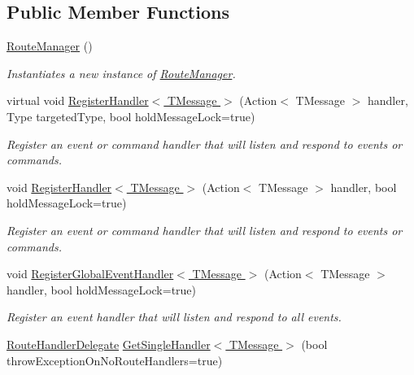 \subsection*{Public Member Functions}
\begin{DoxyCompactItemize}
\item 
\hyperlink{classCqrs_1_1Bus_1_1RouteManager_abcc8a62319ac7a6edd38ed2d26ef5234_abcc8a62319ac7a6edd38ed2d26ef5234}{Route\+Manager} ()
\begin{DoxyCompactList}\small\item\em Instantiates a new instance of \hyperlink{classCqrs_1_1Bus_1_1RouteManager}{Route\+Manager}. \end{DoxyCompactList}\item 
virtual void \hyperlink{classCqrs_1_1Bus_1_1RouteManager_a5a01e8a6c9ae6311bca2d9e5cb75a7b9_a5a01e8a6c9ae6311bca2d9e5cb75a7b9}{Register\+Handler$<$ T\+Message $>$} (Action$<$ T\+Message $>$ handler, Type targeted\+Type, bool hold\+Message\+Lock=true)
\begin{DoxyCompactList}\small\item\em Register an event or command handler that will listen and respond to events or commands. \end{DoxyCompactList}\item 
void \hyperlink{classCqrs_1_1Bus_1_1RouteManager_aeb620222dd0351a6d3848caf93e29954_aeb620222dd0351a6d3848caf93e29954}{Register\+Handler$<$ T\+Message $>$} (Action$<$ T\+Message $>$ handler, bool hold\+Message\+Lock=true)
\begin{DoxyCompactList}\small\item\em Register an event or command handler that will listen and respond to events or commands. \end{DoxyCompactList}\item 
void \hyperlink{classCqrs_1_1Bus_1_1RouteManager_a1f8fb95b11955aa0762a76f9b39233ec_a1f8fb95b11955aa0762a76f9b39233ec}{Register\+Global\+Event\+Handler$<$ T\+Message $>$} (Action$<$ T\+Message $>$ handler, bool hold\+Message\+Lock=true)
\begin{DoxyCompactList}\small\item\em Register an event handler that will listen and respond to all events. \end{DoxyCompactList}\item 
\hyperlink{classCqrs_1_1Bus_1_1RouteHandlerDelegate}{Route\+Handler\+Delegate} \hyperlink{classCqrs_1_1Bus_1_1RouteManager_a1fafb5abc81384949c51b1d8887a7921_a1fafb5abc81384949c51b1d8887a7921}{Get\+Single\+Handler$<$ T\+Message $>$} (bool throw\+Exception\+On\+No\+Route\+Handlers=true)

\end{DoxyCompactItemize}
